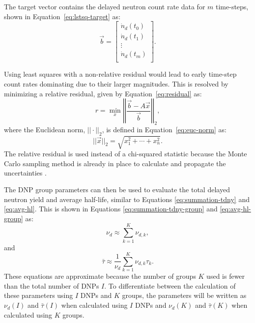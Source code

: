 \documentclass[hidelinks]{style/nseJournal}
\begin{document}
The target vector contains the delayed neutron count rate data for $m$ time-steps, shown in Equation~\eqref{eq:lstsq-target} as:
\begin{equation}
\vec{b} = 
\begin{bmatrix}
 \dot{n}_d(t_0)  \\
 \dot{n}_d(t_1) \\
\vdots\\
\dot{n}_d(t_m)\\
\end{bmatrix}.
\label{eq:lstsq-target}
\end{equation}

Using least squares with a non-relative residual would lead to early time-step count rates dominating due to their larger magnitudes.
This is resolved by minimizing a relative residual, given by Equation~\eqref{eq:residual} as:
\begin{equation}
    r = \min_x \left| \left| \frac{\vec{b} - A\vec{x}}{\vec{b}} \right| \right|_2,
    \label{eq:residual}
\end{equation}
where the Euclidean norm, $||\cdot||_2$, is defined in Equation~\eqref{eq:euc-norm} as:
\begin{equation}
    ||\vec{x}||_2 = \sqrt{x_1^2 + \cdots + x_n^2}.
    \label{eq:euc-norm}
\end{equation}
The relative residual is used instead of a chi-squared statistic because the Monte Carlo sampling method is already in place to calculate and propagate the uncertainties \cite{Bevington2003Data}.

The \gls{DNP} group parameters can then be used to evaluate the total delayed neutron yield and average half-life, similar to Equations \eqref{eq:summation-tdny} and \eqref{eq:avg-hl}.
This is shown in Equations \eqref{eq:summation-tdny-group} and \eqref{eq:avg-hl-group} as:
\begin{equation}
    \nu_d \approx \sum_{k=1}^K \nu_{d,k},
    \label{eq:summation-tdny-group}
\end{equation}
and
\begin{equation}
    \bar{\tau} \approx \frac{1}{\nu_d} \sum_{k=1}^K \nu_{d,k} \tau_k.
    \label{eq:avg-hl-group}
\end{equation}
These equations are approximate because the number of groups $K$ used is fewer than the total number of \glspl{DNP} $I$.
To differentiate between the calculation of these parameters using $I$ \glspl{DNP} and $K$ groups, the parameters will be written as $\nu_d(I)$ and $\bar{\tau}(I)$ when calculated using $I$ \glspl{DNP} and $\nu_d(K)$ and $\bar{\tau}(K)$ when calculated using $K$ groups.
\end{document}

